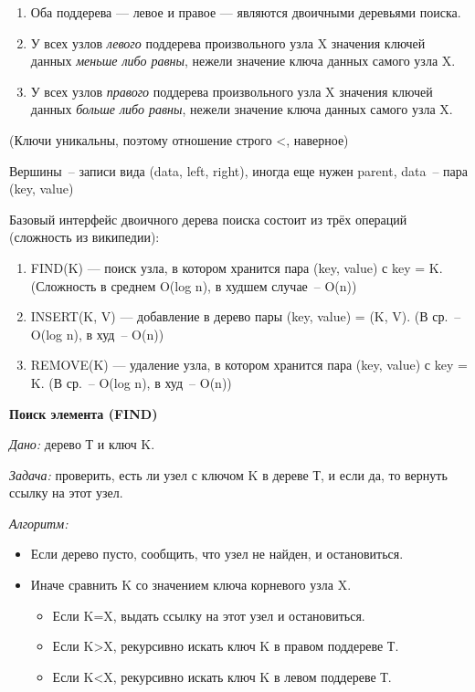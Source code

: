\begin{enumerate}
\item Оба поддерева — левое и правое — являются двоичными деревьями поиска.
\item У всех узлов \textit{левого} поддерева произвольного узла X значения ключей данных \textit{меньше либо равны}, нежели значение ключа данных самого узла X.
\item У всех узлов \textit{правого} поддерева произвольного узла X значения ключей данных \textit{больше либо равны}, нежели значение ключа данных самого узла X.
\end{enumerate}


(Ключи уникальны, поэтому отношение строго <, наверное)

Вершины~-- записи вида (data, left, right), иногда еще нужен parent, data~-- пара (key, value)

Базовый интерфейс двоичного дерева поиска состоит из трёх операций (сложность из википедии):

\begin{enumerate}
\item FIND(K) — поиск узла, в котором хранится пара (key, value) с key = K. (Сложность в среднем  O(log n), в худшем случае~-- O(n))
\item INSERT(K, V) — добавление в дерево пары (key, value) = (K, V). (В ср.~-- O(log n), в худ~-- O(n))
\item REMOVE(K) — удаление узла, в котором хранится пара (key, value) с key = K. (В ср.~-- O(log n), в худ~-- O(n))
\end{enumerate}



{\bf Поиск элемента (FIND)}

\textit{Дано:} дерево Т и ключ K.

\textit{Задача:} проверить, есть ли узел с ключом K в дереве Т, и если да, то вернуть ссылку на этот узел.

\textit{Алгоритм:}

\begin{itemize}
\item Если дерево пусто, сообщить, что узел не найден, и остановиться.
\item Иначе сравнить K со значением ключа корневого узла X.
\begin{itemize}
\item[\labelitemi] Если K=X, выдать ссылку на этот узел и остановиться.
\item[\labelitemi] Если K>X, рекурсивно искать ключ K в правом поддереве Т.
\item[\labelitemi] Если K<X, рекурсивно искать ключ K в левом поддереве Т.
\end{itemize}
\end{itemize}

